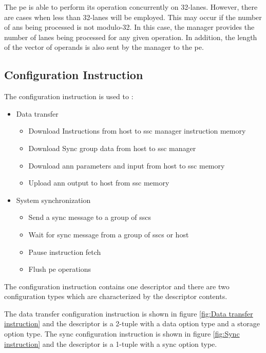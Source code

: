 The \ac{pe} is able to perform its operation concurrently on 32-lanes. However, there are cases when less than 32-lanes will be employed. This may occur if the number of \acp{an} being processed is not modulo-32. In this case, the manager provides the number of lanes being processed for any given operation. In addition, the length of the vector of operands is also sent by the manager to the \ac{pe}.
\fi

\subsection{Configuration Instruction}
\label{sec:Configuration Instruction}

The configuration instruction is used to :
\begin{itemize}
  \lbbcleanspace
    \item Data transfer
    \begin{itemize}
      \item Download Instructions from host to \ac{ssc} manager instruction memory
      \item Download Sync group data from host to \ac{ssc} manager 
      \item Download \ac{ann} parameters and input from host to \ac{ssc} memory
      \item Upload \ac{ann} output to host from \ac{ssc} memory
    \end{itemize}
  \item System synchronization
    \begin{itemize}
      \item Send a sync message to a group of \acp{ssc}
      \item Wait for sync message from a group of \acp{ssc} or host
      \item Pause instruction fetch
      \item Flush \ac{pe} operations
    \end{itemize}
\end{itemize}

The configuration instruction contains one descriptor and there are two configuration types which are characterized by the descriptor contents.

The data transfer configuration instruction is shown in figure \ref{fig:Data transfer instruction} and the descriptor is a 2-tuple with a data option type and a storage option type.
The sync configuration instruction is shown in figure \ref{fig:Sync instruction} and the descriptor is a 1-tuple with a sync option type.

